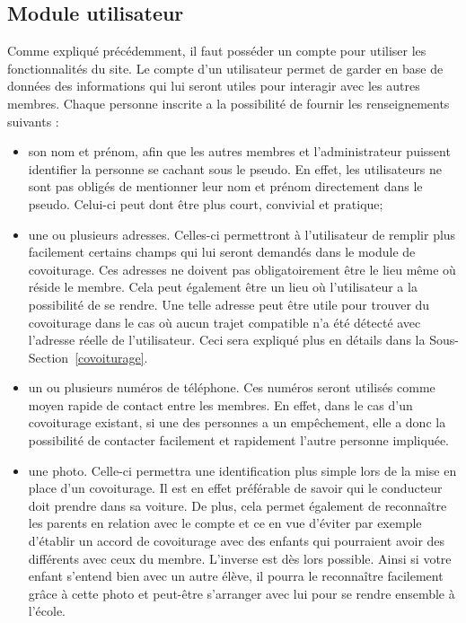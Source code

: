 \documentclass[12pt, a4paper, oneside]{article}
\begin{document}
\subsection{Module utilisateur} \label{utilisateur}
    Comme expliqué précédemment, il faut posséder un compte pour utiliser les fonctionnalités du site. Le compte d'un utilisateur permet de garder en base de données des informations qui lui seront utiles pour interagir avec les autres membres. Chaque personne inscrite a la possibilité de fournir les renseignements suivants :\\
    \begin{itemize}
        \item son nom et prénom, afin que les autres membres et l'administrateur puissent identifier la personne se cachant sous le pseudo. En effet, les utilisateurs ne sont pas obligés de mentionner leur nom et prénom directement dans le pseudo. Celui-ci peut dont être plus court, convivial et pratique;\\
        \item une ou plusieurs adresses. Celles-ci permettront à l'utilisateur de remplir plus facilement certains champs qui lui seront demandés dans le module de covoiturage. Ces adresses ne doivent pas obligatoirement être le lieu même où réside le membre. Cela peut également être un lieu où l'utilisateur a la possibilité de se rendre. Une telle adresse peut être utile pour trouver du covoiturage dans le cas où aucun trajet compatible n'a été détecté avec l'adresse réelle de l'utilisateur. Ceci sera expliqué plus en détails dans la Sous-Section~\ref{covoiturage}.\\
        \item un ou plusieurs numéros de téléphone. Ces numéros seront utilisés comme moyen rapide de contact entre les membres. En effet, dans le cas d'un covoiturage existant, si une des personnes a un empêchement, elle a donc la possibilité de contacter facilement et rapidement l'autre personne impliquée.\\
        \item une photo. Celle-ci permettra une identification plus simple lors de la mise en place d'un covoiturage. Il est en effet préférable de savoir qui le conducteur doit prendre dans sa voiture. De plus, cela permet également de reconnaître les parents en relation avec le compte et ce en vue d'éviter par exemple d'établir un accord de covoiturage avec des enfants qui pourraient avoir des différents avec ceux du membre. L'inverse est dès lors possible. Ainsi si votre enfant s'entend bien avec un autre élève, il pourra le reconnaître facilement grâce à cette photo et peut-être s'arranger avec lui pour se rendre ensemble à l'école.\\
    \end{itemize}
\end{document}
